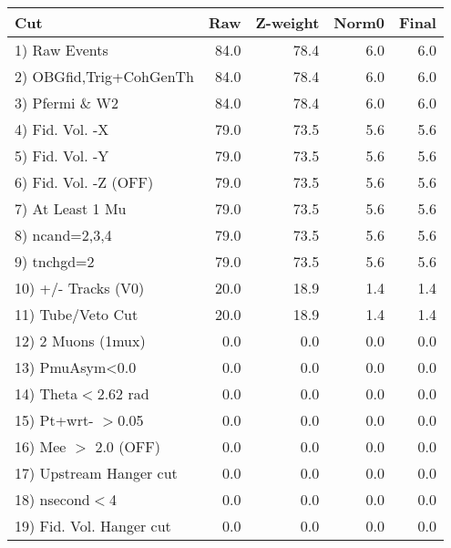  \begin{table}[h!]\centering
 \begin{tabular}{||l||r|r|r|r||}
 \hline
 \hline
 Cut & Raw & Z-weight & Norm0 & Final \\
 \hline
  1) Raw Events           &        84.0 &        78.4 &         6.0 &         6.0 \\
  2) OBGfid,Trig+CohGenTh &        84.0 &        78.4 &         6.0 &         6.0 \\
  3) Pfermi \& W2         &        84.0 &        78.4 &         6.0 &         6.0 \\
  4) Fid. Vol. -X         &        79.0 &        73.5 &         5.6 &         5.6 \\
  5) Fid. Vol. -Y         &        79.0 &        73.5 &         5.6 &         5.6 \\
  6) Fid. Vol. -Z (OFF)   &        79.0 &        73.5 &         5.6 &         5.6 \\
  7) At Least 1 Mu        &        79.0 &        73.5 &         5.6 &         5.6 \\
  8) ncand=2,3,4          &        79.0 &        73.5 &         5.6 &         5.6 \\
  9) tnchgd=2             &        79.0 &        73.5 &         5.6 &         5.6 \\
 10) +/- Tracks (V0)      &        20.0 &        18.9 &         1.4 &         1.4 \\
 11) Tube/Veto Cut        &        20.0 &        18.9 &         1.4 &         1.4 \\
 12) 2 Muons (1mux)       &         0.0 &         0.0 &         0.0 &         0.0 \\
 13) PmuAsym<0.0          &         0.0 &         0.0 &         0.0 &         0.0 \\
 14) Theta$<$2.62 rad     &         0.0 &         0.0 &         0.0 &         0.0 \\
 15) Pt+wrt- $>$0.05      &         0.0 &         0.0 &         0.0 &         0.0 \\
 16) Mee $>$ 2.0  (OFF)   &         0.0 &         0.0 &         0.0 &         0.0 \\
 17) Upstream Hanger cut  &         0.0 &         0.0 &         0.0 &         0.0 \\
 18) nsecond$<$4          &         0.0 &         0.0 &         0.0 &         0.0 \\
 19) Fid. Vol. Hanger cut &         0.0 &         0.0 &         0.0 &         0.0 \\

\end{tabular}
\end{table}
